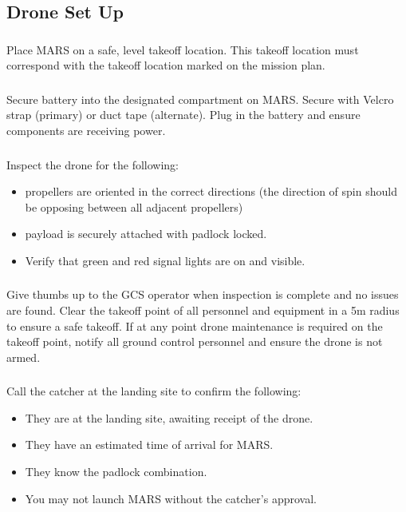     \subsection{Drone Set Up} 
        \subsubsection{} Place MARS on a safe, level takeoff location. This takeoff location must correspond with the takeoff location marked on the mission plan.
        \subsubsection{} Secure battery into the designated compartment on MARS. Secure with Velcro strap (primary) or duct tape (alternate). Plug in the battery and ensure components are receiving power. 
        \subsubsection{} Inspect the drone for the following:
        \begin{itemize}
            \item propellers are oriented in the correct directions (the direction of spin should be opposing between all adjacent propellers)
            \item payload is securely attached with padlock locked. 
            \item Verify that green and red signal lights are on and visible. 
        \end{itemize}
        \subsubsection{} Give thumbs up to the GCS operator when inspection is complete and no issues are found. Clear the takeoff point of all personnel and equipment in a 5m radius to ensure a safe takeoff. If at any point drone maintenance is required on the takeoff point, notify all ground control personnel and ensure the drone is not armed. 
        \subsubsection{} Call the catcher at the landing site to confirm the following: 
        \begin{itemize}
            \item They are at the landing site, awaiting receipt of the drone. 
            \item They have an estimated time of arrival for MARS. 
            \item They know the padlock combination. 
            \item You may not launch MARS without the catcher’s approval. 
        \end{itemize}
    
